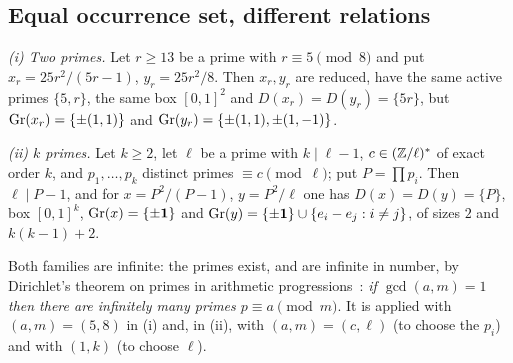 \subsection{Equal occurrence set, different relations}
\begin{theorem}\label{thm:R3T1}
\emph{(i) Two primes.} Let $r\ge13$ be a prime with $r\equiv5\pmod 8$ and put $x_r=25r^2/(5r-1)$, $y_r=25r^2/8$. Then $x_r,y_r$ are reduced, have the same active primes $\{5,r\}$, the same box $[0,1]^2$ and $D(x_r)=D(y_r)=\{5r\}$, but $\mathrm{Gr}(x_r)=\{\pm(1,1)\}$ and $\mathrm{Gr}(y_r)=\{\pm(1,1),\pm(1,-1)\}$.

\emph{(ii) $k$ primes.} Let $k\ge2$, let $\ell$ be a prime with $k\mid\ell-1$, $c\in(\mathbb Z/\ell)^*$ of exact order $k$, and $p_1,\dots,p_k$ distinct primes $\equiv c\pmod\ell$; put $P=\prod p_i$. Then $\ell\mid P-1$, and for $x=P^2/(P-1)$, $y=P^2/\ell$ one has $D(x)=D(y)=\{P\}$, box $[0,1]^k$, $\mathrm{Gr}(x)=\{\pm\mathbf 1\}$ and $\mathrm{Gr}(y)=\{\pm\mathbf 1\}\cup\{e_i-e_j:i\ne j\}$, of sizes $2$ and $k(k-1)+2$.

Both families are infinite: the primes exist, and are infinite in number, by Dirichlet's theorem on primes in arithmetic progressions~\cite{Dirichlet1837}: \emph{if $\gcd(a,m)=1$ then there are infinitely many primes $p\equiv a\pmod m$}. It is applied with $(a,m)=(5,8)$ in (i) and, in (ii), with $(a,m)=(c,\ell)$ (to choose the $p_i$) and with $(1,k)$ (to choose $\ell$).
\end{theorem}
